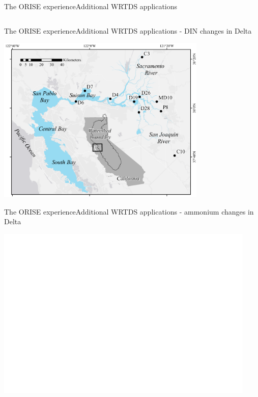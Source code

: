 \documentclass[serif]{beamer}\usepackage[]{graphicx}\usepackage[]{color}
\begin{document}
\begin{frame}{The ORISE experience}{Additional WRTDS applications}
\begin{columns}
\begin{column}{0.65\textwidth}
\end{column}
\end{columns}
\end{frame}

\begin{frame}{The ORISE experience}{Additional WRTDS applications - DIN changes in Delta}
\centerline{\includegraphics[width = 0.75\textwidth]{fig/delt_map.pdf}}
\end{frame}

\begin{frame}{The ORISE experience}{Additional WRTDS applications - ammonium changes in Delta}
\centerline{\includegraphics[width = 0.93\textwidth, page = 2]{fig/trndsperdin.pdf}}
\end{frame}
\end{document}
